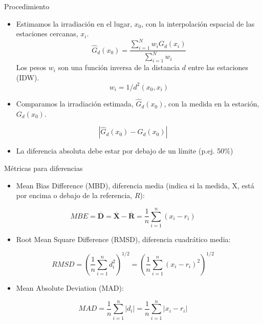 \documentclass[aspectratio=169, usenames,svgnames,dvipsnames]{beamer}
\begin{document}
\begin{frame}[label={sec:orgb9b4900}]{Procedimiento}
\begin{itemize}
\item Estimamos la irradiación en el lugar, \(x_0\), con la interpolación espacial de las estaciones cercanas, \(x_i\).
\[
\widehat{G}_d(x_0) = \frac{\sum_{i=1}^N w_i G_{d}(x_i)}{\sum_{i=1}^N w_i} 
\]
Los pesos \(w_i\) son una función inversa de la distancia \(d\) entre las estaciones (IDW).
\[
  w_i = 1/d^2(x_0, x_i)
\]

\item Comparamos la irradiación estimada, \(\widehat{G}_d(x_0)\), con la medida en la estación, \(G_d(x_0)\).
\end{itemize}
\[
\left| \widehat{G}_d(x_0) - G_d(x_0) \right|
\]
\begin{itemize}
\item La diferencia absoluta debe estar por debajo de un límite (p.ej. 50\%)
\end{itemize}
\end{frame}


\begin{frame}[label={sec:orgf8c4ac5}]{Métricas para diferencias}
\begin{itemize}
\item Mean Bias Difference (MBD), diferencia media (indica si la medida, X,  está por encima o debajo de la referencia, \(R\)):
\end{itemize}
\[
MBE = \overline{\mathbf{D}} = \overline{\mathbf{X}} - \overline{\mathbf{R}} = \frac{1}{n} \sum_{i=1}^n (x_i - r_i)
\]

\begin{itemize}
\item Root Mean Square Difference (RMSD), diferencia cuadrático media:
\end{itemize}
\[
RMSD = \left(\frac{1}{n} \sum_{i=1}^n d_i^2 \right)^{1/2} =  \left( \frac{1}{n} \sum_{i=1}^n (x_i - r_i)^2  \right)^{1/2}
\]

\begin{itemize}
\item Mean Absolute Deviation (MAD):
\end{itemize}

\[
MAD = \frac{1}{n} \sum_{i=1}^n \left|d_i\right| =  \frac{1}{n} \sum_{i=1}^n \left|x_i - r_i\right|
\]
\end{frame}
\end{document}
